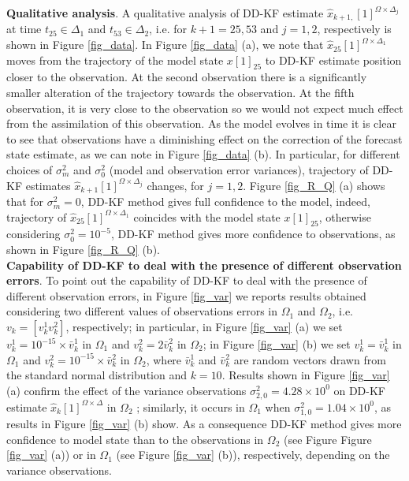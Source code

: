 \documentclass[smallcondensed]{svjour3}
\begin{document}
\noindent \textbf{Qualitative analysis}. A qualitative analysis of DD-KF estimate $\widehat{x}_{k+1,}[1]^{\Omega \times \Delta_{j}}$ at time $t_{25}\in \Delta_{1}$ and $t_{53}\in \Delta_{2}$, i.e. for $k+1=25,53$ and $j=1,2$, respectively is shown in Figure \ref{fig_data}. In Figure \ref{fig_data} (a), we note that $\widehat{x}_{25}[1]^{\Omega \times \Delta_{1}}$ moves from the trajectory of the model state $x[1]_{25}$ to DD-KF estimate position closer to the observation. At the second observation there is a significantly smaller alteration of the trajectory towards the observation. At the fifth observation, it is very close to the observation so we would not expect much effect from the assimilation of this observation. As the model evolves in
time it is clear to see that  observations have a diminishing effect on the correction
of the forecast state estimate, as we can note in Figure \ref{fig_data} (b). In particular, for different choices of  $\sigma_{m}^{2}$ and $\sigma_{0}^{2}$ (model and  observation error variances),  trajectory of DD-KF estimates $\widehat{x}_{k+1}[1]^{\Omega \times \Delta_{j}}$  changes, for $j=1,2$. Figure \ref{fig_R_Q} (a) shows that for $\sigma_{m}^{2}=0$,  DD-KF method gives full confidence to the model, indeed, trajectory of  $\widehat{x}_{25}[1]^{\Omega \times \Delta_{1}}$ coincides with the model state $x[1]_{25}$, otherwise considering  $\sigma_{0}^{2}=10^{-5}$,  DD-KF method gives more confidence to observations,  as shown in Figure \ref{fig_R_Q} (b).\\ 

\noindent \textbf{Capability of DD-KF to deal with the presence of different observation errors}.   To point out the capability of DD-KF to deal with the presence of different observation errors, in Figure \ref{fig_var} we  reports results obtained considering two different values of observations errors  in $\Omega_1$ and $\Omega_2$, i.e.  $v_k=[v_k^1 v_k^2]$, respectively;    in particular, in  Figure \ref{fig_var} (a) we set  $v_k^1=10^{-15} \times \bar{v}_k^1$ in $\Omega_1$ and $v_k^2=2  \bar{v}_k^2$ in $\Omega_2$; in  Figure \ref{fig_var} (b) we set   $v_k^1=  \bar{v}_k^1$ in $\Omega_1$ and $v_k^2=10^{-15} \times \bar{v}_k^2$ in $\Omega_2$, where $\bar{v}_k^{1}$ and $\bar{v}_k^{2}$ are random vectors drawn from the standard normal distribution and $k=10$. Results shown in  Figure \ref{fig_var} (a) confirm the effect of the variance observations $\sigma_{2,0}^{2}=  4.28 \times 10^{0}$ on  DD-KF estimate $\widehat{x}_{k}[1]^{\Omega \times \Delta}$  in  $\Omega_2$ ; similarly, it occurs  in $\Omega_1$ when $\sigma_{1,0}^{2} = 1.04 \times 10^{0}$, as results in Figure \ref{fig_var} (b) show. As a consequence DD-KF method gives more confidence to model state than to the observations in $\Omega_2$ (see Figure  Figure \ref{fig_var} (a)) or in $\Omega_1$ (see Figure \ref{fig_var} (b)), respectively, depending on the variance observations. \\
\end{document}
